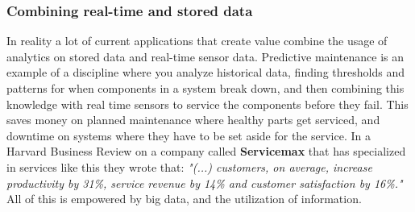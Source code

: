 \documentclass[a4paper,english]{report}
\begin{document}
				\subsubsection{Combining real-time and stored data}
				In reality a lot of current applications that create value combine the usage of analytics on stored data and real-time sensor data. Predictive maintenance is an example of a discipline where you analyze historical data, finding thresholds and patterns for when components in a system break down, and then combining this knowledge with real time sensors to service the components before they fail. This saves money on planned maintenance where healthy parts get serviced, and downtime on systems where they have to be set aside for the service. In a Harvard Business Review on a company called \textbf{Servicemax} that has specialized in services like this they wrote that:
				\textit{"(...) customers, on average, increase productivity by 31\%, service revenue by 14\% and customer satisfaction by 16\%."}\cite{servicemax} All of this is empowered by big data, and the utilization of information.
			
\end{document}

